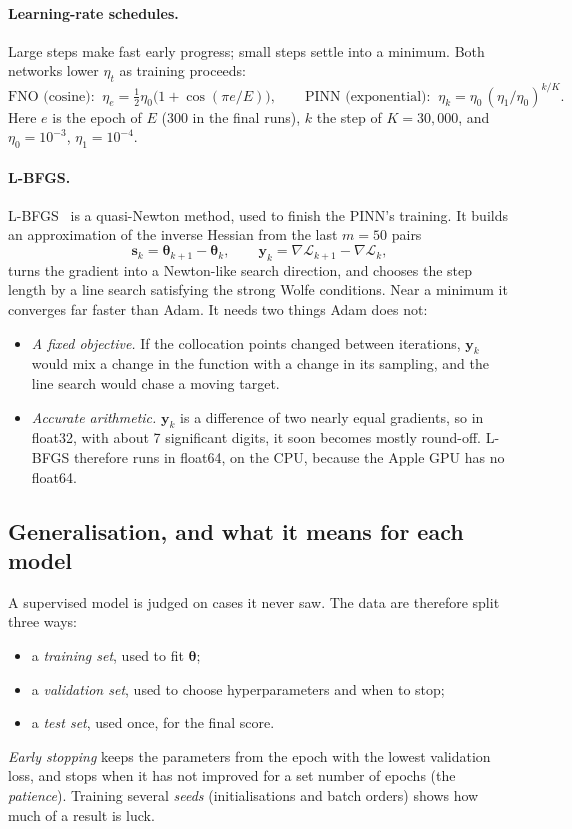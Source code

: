 \paragraph{Learning-rate schedules.}
Large steps make fast early progress; small steps settle into a minimum. Both networks lower
$\eta_t$ as training proceeds:
\begin{equation}
  \text{FNO (cosine): }\ \eta_e = \tfrac12\eta_0\bigl(1 + \cos(\pi e/E)\bigr),\qquad
  \text{PINN (exponential): }\ \eta_k = \eta_0\,(\eta_1/\eta_0)^{k/K}.
\end{equation}
Here $e$ is the epoch of $E$ (300 in the final runs), $k$ the step of $K = 30{,}000$, and
$\eta_0 = 10^{-3}$, $\eta_1 = 10^{-4}$.

\paragraph{L-BFGS.}
L-BFGS~\cite{liu1989lbfgs} is a quasi-Newton method, used to finish the PINN's training. It builds
an approximation of the inverse Hessian from the last $m = 50$ pairs
\begin{equation}
  \bm s_k = \bm\theta_{k+1} - \bm\theta_k,\qquad \bm y_k = \nabla\mathcal L_{k+1} - \nabla\mathcal L_k,
\end{equation}
turns the gradient into a Newton-like search direction, and chooses the step length by a line
search satisfying the strong Wolfe conditions. Near a minimum it converges far faster than Adam.
It needs two things Adam does not:
\begin{itemize}
  \item \emph{A fixed objective.} If the collocation points changed between iterations, $\bm y_k$
    would mix a change in the function with a change in its sampling, and the line search would
    chase a moving target.
  \item \emph{Accurate arithmetic.} $\bm y_k$ is a difference of two nearly equal gradients, so in
    float32, with about 7 significant digits, it soon becomes mostly round-off. L-BFGS therefore
    runs in float64, on the CPU, because the Apple GPU has no float64.
\end{itemize}

\subsection{Generalisation, and what it means for each model}

A supervised model is judged on cases it never saw. The data are therefore split three ways:
\begin{itemize}
  \item a \emph{training set}, used to fit $\bm\theta$;
  \item a \emph{validation set}, used to choose hyperparameters and when to stop;
  \item a \emph{test set}, used once, for the final score.
\end{itemize}
\emph{Early stopping} keeps the parameters from the epoch with the lowest validation loss, and stops
when it has not improved for a set number of epochs (the \emph{patience}). Training several
\emph{seeds} (initialisations and batch orders) shows how much of a result is luck.

